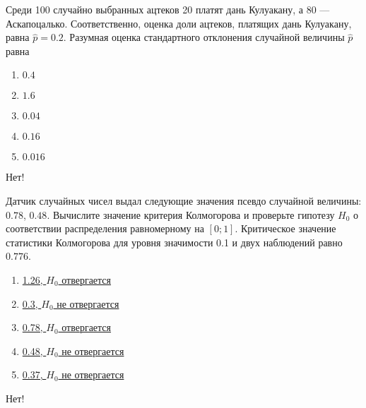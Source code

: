 \documentclass[t]{beamer}
\begin{document}
 \begin{frame} \label{59-No} 
\begin{block}{59} 

Среди 100 случайно выбранных ацтеков 20 платят дань Кулуакану, а 80 — Аскапоцалько. Соответственно, оценка доли ацтеков, платящих дань Кулуакану, равна $\hat{p}=0.2$. Разумная оценка стандартного отклонения случайной величины $\hat{p}$ равна
 


 \end{block} 
\begin{enumerate} 
\item[] \hyperlink{59-No}{\beamergotobutton{} $0.4$}
\item[] \hyperlink{59-No}{\beamergotobutton{} $1.6$}
\item[] \hyperlink{59-Yes}{\beamergotobutton{} $0.04$}
\item[] \hyperlink{59-No}{\beamergotobutton{} $0.16$}
\item[] \hyperlink{59-No}{\beamergotobutton{} $0.016$}
\end{enumerate} 

 \alert{Нет!} 
\end{frame} 


 \begin{frame} \label{60-No} 
\begin{block}{60} 

Датчик случайных чисел выдал следующие значения псевдо случайной величины: $0.78$, $0.48$. Вычислите значение критерия Колмогорова и проверьте гипотезу $H_0$ о соответствии распределения равномерному на $[0;1]$. Критическое значение статистики Колмогорова для уровня значимости 0.1 и двух наблюдений равно $0.776$.
 


 \end{block} 
\begin{enumerate} 
\item[] \hyperlink{60-No}{\beamergotobutton{} 1.26, $H_0$ отвергается}
\item[] \hyperlink{60-No}{\beamergotobutton{} 0.3, $H_0$ не отвергается}
\item[] \hyperlink{60-Yes}{\beamergotobutton{} 0.78, $H_0$ отвергается}
\item[] \hyperlink{60-No}{\beamergotobutton{} 0.48, $H_0$ не отвергается}
\item[] \hyperlink{60-No}{\beamergotobutton{} 0.37, $H_0$ не отвергается}
\end{enumerate} 

 \alert{Нет!} 
\end{frame} 
\end{document}
